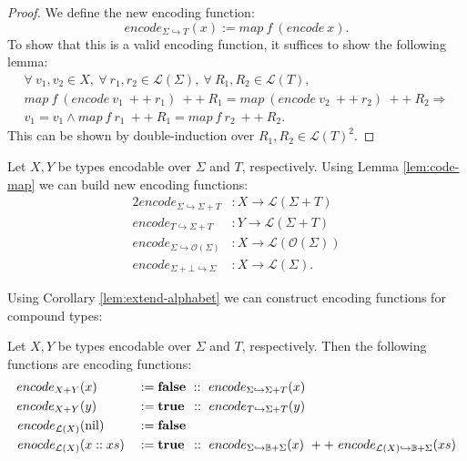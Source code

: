 \documentclass{psartcl}
\newcommand{\nil}{\M{nil}}
\newcommand{\cons}{~ :: ~}
\newcommand{\app}{~ ++ ~}
\newcommand{\from}{:}
\renewcommand{\to}{\rightarrow}
\newcommand{\Opt}{\mathcal{O}}
\newcommand{\Bool}{\mathbb{B}}
\newcommand{\List}{\mathcal{L}}
\newcommand{\true}{\mathbf{true}}
\newcommand{\false}{\mathbf{false}}
\newcommand{\Tau}{T}
\begin{document}
\begin{proof}
  We define the new encoding function:
  $$encode_{\Sigma \hookrightarrow \Tau}(x) := map~f~(encode~x).$$
  To show that this is a valid encoding function, it suffices to show the following lemma:
  \begin{multline*}
    \forall~v_1,v_2 \in X,~\forall~r_1, r_2 \in \List(\Sigma),~\forall~R_1, R_2 \in \List(\Tau),\\
    map~f~(encode~v_1 \app r_1) \app R_1 = map~(encode~v_2 \app r_2) \app R_2 \Rightarrow \\
    v_1 = v_1 \land map~f~r_1 \app R_1 = map~f~r_2 \app R_2.
  \end{multline*}
  This can be shown by double-induction over $R_1, R_2 \in \List(\Tau)^2$.
\end{proof}


\begin{corollary}
  \label{lem:extend-alphabet}
  Let $X, Y$ be types encodable over $\Sigma$ and $\Tau$, respectively.
  Using Lemma \ref{lem:code-map} we can build new encoding functions:
  \begin{alignat*}{2}
    encode_{\Sigma \hookrightarrow \Sigma + \Tau} &\from X \to \List(\Sigma + \Tau) \\
    encode_{\Tau   \hookrightarrow \Sigma + \Tau} &\from Y \to \List(\Sigma + \Tau) \\
    encode_{\Sigma \hookrightarrow \Opt(\Sigma)}  &\from X \to \List(\Opt(\Sigma)) \\
    encode_{\Sigma + \bot \hookrightarrow \Sigma} &\from X \to \List(\Sigma).
  \end{alignat*}
\end{corollary}

Using Corollary \ref{lem:extend-alphabet} we can construct encoding functions for compound types:
\begin{corollary}
  \label{lem:code-compound}
  Let $X, Y$ be types encodable over $\Sigma$ and $\Tau$, respectively.
  Then the following functions are encoding functions:
  \begin{alignat*}{2}
    encode_{X+Y}&(x)             &&:= \false                 \cons encode_{\Sigma \hookrightarrow \Sigma + \Tau}(x) \\
    encode_{X+Y}&(y)             &&:= \true \hspace{0.15em} \cons encode_{\Tau   \hookrightarrow \Sigma + \Tau}(y) \\
    encode_{\List(X)}& (\nil)    &&:= \false \\
    enocde_{\List(X)}& (x :: xs) &&:= \true \hspace{0.15em} \cons encode_{\Sigma \hookrightarrow \Bool + \Sigma}(x) \app
                                      encode_{\List(X) \hookrightarrow \Bool + \Sigma}(xs)
  \end{alignat*}
\end{corollary}
\end{document}
